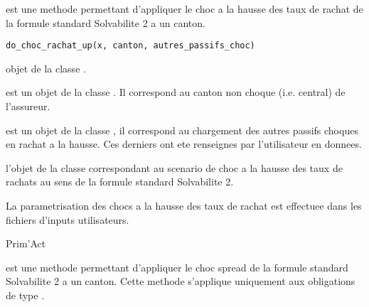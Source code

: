 \documentclass[a4paper]{book}
\begin{document}
%
\begin{Description}\relax
{} est une methode permettant d'appliquer le choc a la hausse des taux de rachat
de la formule standard Solvabilite 2 a un canton.
\end{Description}
%
\begin{Usage}
\begin{verbatim}
do_choc_rachat_up(x, canton, autres_passifs_choc)
\end{verbatim}
\end{Usage}
%
\begin{Arguments}
\begin{ldescription}
\item[\code{x}] objet de la classe .

\item[\code{canton}] est un objet de la classe . Il correspond au canton non choque (i.e. central)
de l'assureur.

\item[\code{autres\_passifs\_choc}] est un objet de la classe , il correspond au chargement
des autres passifs choques en rachat a la hausse.
Ces derniers ont ete renseignes par l'utilisateur en donnees.
\end{ldescription}
\end{Arguments}
%
\begin{Value}
 l'objet  de la classe  correspondant au scenario de choc a la hausse
des taux de rachats au sens de la formule standard Solvabilite 2.
\end{Value}
%
\begin{Note}\relax
La parametrisation des chocs a la hausse des taux de rachat est effectuee dans les fichiers d'inputs
utilisateurs.
\end{Note}
%
\begin{Author}\relax
Prim'Act
\end{Author}
%
\begin{Description}\relax
{} est une methode permettant d'appliquer le choc spread de la formule standard Solvabilite 2
a un canton. Cette methode s'applique uniquement aux obligations de type .
\end{Description}
\end{document}

